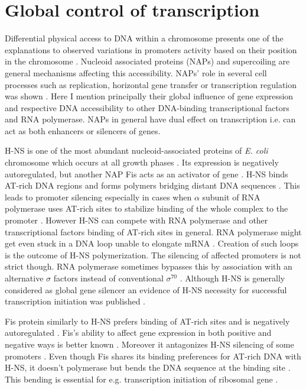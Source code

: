 \section{Global control of transcription}
Differential physical access to DNA within a chromosome presents one of the explanations to observed variations in promoters activity based on their position in the chromosome \cite{bryant2014chromosome}.
Nucleoid associated proteins (NAPs) and supercoiling are general mechanisms affecting this accessibility.
NAPs' role in several cell processes such as replication, horizontal gene transfer or transcription regulation was shown \cite{dixon1984protein, kayoko1992histone, aznar2013hha}.
Here I mention principally their global influence of gene expression and respective DNA accessibility to other DNA-binding transcriptional factors and RNA polymerase.
NAPs in general have dual effect on transcription i.e. can act as both enhancers or silencers of genes.

H-NS is one of the most abundant nucleoid-associated proteins of \textit{E. coli} chromosome which occurs at all growth phases \cite{azam1999growth}.
Its expression is negatively autoregulated, but another NAP Fis acts as an activator of  gene \cite{ueguchi1993autoregulatory, falconi1996antagonistic}.
H-NS binds AT-rich DNA regions and forms polymers bridging distant DNA sequences  \cite{navarre2006selective, arold2010h}.
This leads to promoter silencing especially in cases when $\alpha$ subunit of RNA polymerase uses AT-rich sites to stabilize binding of the whole complex to the promoter \cite{singh2013h}.
However H-NS can compete with RNA polymerase and other transcriptional factors binding of AT-rich sites in general.
RNA polymerase might get even stuck in a DNA loop unable to elongate mRNA \cite{dame2002structural}.
Creation of such loops is the outcome of H-NS polymerization.
The silencing of affected promoters is not strict though.
RNA polymerase sometimes bypasses this by association with an alternative $\sigma$ factors instead of conventional $\sigma^{70}$ \cite{grainger2008selective}.
Although H-NS is generally considered as global gene silencer an evidence of H-NS necessity for successful transcription initiation was published \cite{singh2013h}.

Fis protein similarly to H-NS prefers binding of AT-rich sites and is negatively autoregulated \cite{ball1992dramatic, stella2010shape}.
Fis's ability to affect gene expression in both positive and negative ways is better known \cite{choi2005effects, karambelkar2012silencing}.
Moreover it antagonizes H-NS silencing of some promoters \cite{falconi2001involvement}.
Even though Fis shares its binding preferences for AT-rich DNA with H-NS, it doesn't polymerase but bends the DNA sequence at the binding site \cite{hubner1989bent}.
This bending is essential for e.g. transcription initiation of ribosomal gene  \cite{gosink1993dna}.

